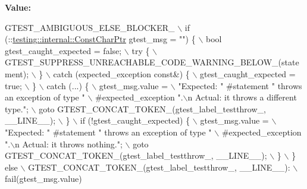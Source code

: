 {\bfseries Value\+:}
\begin{DoxyCode}
GTEST\_AMBIGUOUS\_ELSE\_BLOCKER\_ \(\backslash\)
  if (::\hyperlink{structtesting_1_1internal_1_1ConstCharPtr}{testing::internal::ConstCharPtr} gtest\_msg = \textcolor{stringliteral}{""}) \{ \(\backslash\)
    bool gtest\_caught\_expected = \textcolor{keyword}{false}; \(\backslash\)
    try \{ \(\backslash\)
      GTEST\_SUPPRESS\_UNREACHABLE\_CODE\_WARNING\_BELOW\_(statement); \(\backslash\)
    \} \(\backslash\)
    catch (expected\_exception \textcolor{keyword}{const}&) \{ \(\backslash\)
      gtest\_caught\_expected = \textcolor{keyword}{true}; \(\backslash\)
    \} \(\backslash\)
    catch (...) \{ \(\backslash\)
      gtest\_msg.value = \(\backslash\)
          \textcolor{stringliteral}{"Expected: "} #statement \textcolor{stringliteral}{" throws an exception of type "} \(\backslash\)
\textcolor{preprocessor}{          #expected\_exception ".\(\backslash\)n  Actual: it throws a different type."; \(\backslash\)}
\textcolor{preprocessor}{      goto GTEST\_CONCAT\_TOKEN\_(gtest\_label\_testthrow\_, \_\_LINE\_\_); \(\backslash\)}
\textcolor{preprocessor}{    \} \(\backslash\)}
\textcolor{preprocessor}{    if (!gtest\_caught\_expected) \{ \(\backslash\)}
\textcolor{preprocessor}{      gtest\_msg.value = \(\backslash\)}
\textcolor{preprocessor}{          "Expected: " #statement " throws an exception of type " \(\backslash\)}
\textcolor{preprocessor}{          #expected\_exception ".\(\backslash\)n  Actual: it throws nothing."; \(\backslash\)}
\textcolor{preprocessor}{      goto GTEST\_CONCAT\_TOKEN\_(gtest\_label\_testthrow\_, \_\_LINE\_\_); \(\backslash\)}
\textcolor{preprocessor}{    \} \(\backslash\)}
\textcolor{preprocessor}{  \} else \(\backslash\)}
\textcolor{preprocessor}{    GTEST\_CONCAT\_TOKEN\_(gtest\_label\_testthrow\_, \_\_LINE\_\_): \(\backslash\)}
\textcolor{preprocessor}{      fail(gtest\_msg.value)}
\end{DoxyCode}
